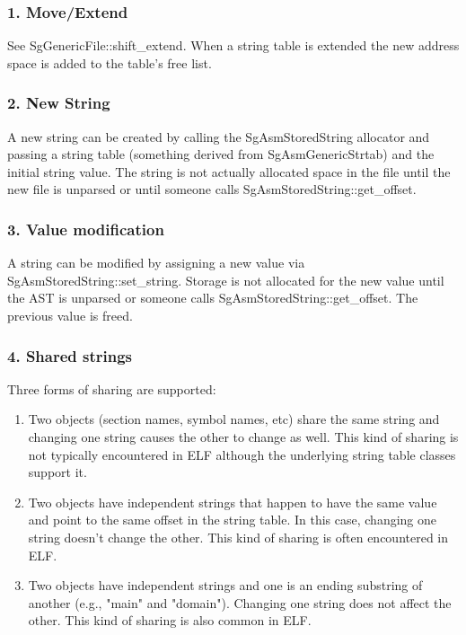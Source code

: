 \subsubsection{1. Move/Extend}

   See SgGenericFile::shift\_extend.  When a string table is extended the new address space is added to the table's free list.

\subsubsection{2. New String}

   A new string can be created by calling the SgAsmStoredString allocator and passing a string table (something derived from
   SgAsmGenericStrtab) and the initial string value.  The string is not actually allocated space in the file until the new file
   is unparsed or until someone calls SgAsmStoredString::get\_offset.

\subsubsection{3. Value modification}

   A string can be modified by assigning a new value via SgAsmStoredString::set\_string. Storage is not allocated for the new
   value until the AST is unparsed or someone calls SgAsmStoredString::get\_offset.  The previous value is freed.

\subsubsection{4. Shared strings}

   Three forms of sharing are supported:

\begin{enumerate}
   \item Two objects (section names, symbol names, etc) share the same string and changing one string causes the other to change
      as well. This kind of sharing is not typically encountered in ELF although the underlying string table classes support
      it.

   \item Two objects have independent strings that happen to have the same value and point to the same offset in the string
      table. In this case, changing one string doesn't change the other. This kind of sharing is often encountered in ELF.

   \item Two objects have independent strings and one is an ending substring of another (e.g., "main" and "domain"). Changing one
      string does not affect the other. This kind of sharing is also common in ELF.
\end{enumerate}

